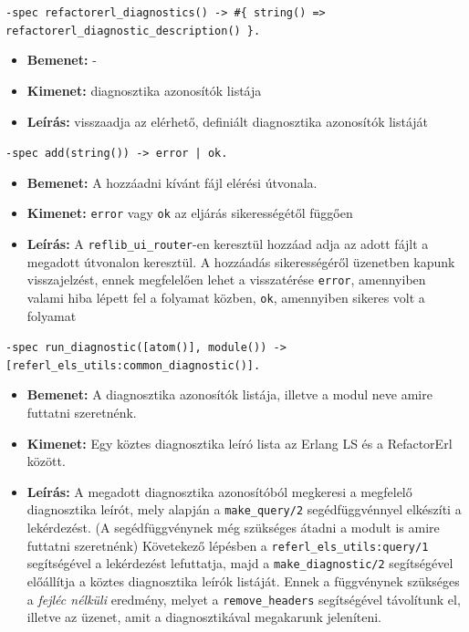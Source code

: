     \noindent \lstinline|-spec refactorerl_diagnostics() -> #{ string() => refactorerl_diagnostic_description() }.|
    \begin{itemize}
        \item \textbf{Bemenet:} -
        \item \textbf{Kimenet:} diagnosztika azonosítók listája
        \item \textbf{Leírás:} visszaadja az elérhető, definiált diagnosztika azonosítók listáját
    \end{itemize}
    
    
    
    \noindent \lstinline{-spec add(string()) -> error | ok.}
    \begin{itemize}
        \item \textbf{Bemenet:} A hozzáadni kívánt fájl elérési útvonala.
        \item \textbf{Kimenet:} \lstinline{error} vagy \lstinline{ok} az eljárás sikerességétől függően
        \item \textbf{Leírás:} A \lstinline{reflib_ui_router}-en keresztül hozzáad adja az adott fájlt a megadott útvonalon keresztül. A hozzáadás sikerességéről üzenetben kapunk visszajelzést, ennek megfelelően lehet a visszatérése \lstinline{error}, amennyiben valami hiba lépett fel a folyamat közben, \lstinline{ok}, amennyiben sikeres volt a folyamat
    \end{itemize}
    
    
    
    \noindent \lstinline{-spec run_diagnostic([atom()], module()) -> [referl_els_utils:common_diagnostic()].}
    \begin{itemize}
        \item \textbf{Bemenet:} A diagnosztika azonosítók listája, illetve a modul neve amire futtatni szeretnénk.
        \item \textbf{Kimenet:} Egy köztes diagnosztika leíró lista az Erlang LS és a RefactorErl között.
        \item \textbf{Leírás:} A megadott diagnosztika azonosítóból megkeresi a megfelelő diagnosztika leírót, mely alapján a \lstinline{make_query/2} segédfüggvénnyel elkészíti a lekérdezést. (A segédfüggvénynek még szükséges átadni a modult is amire futtatni szeretnénk) Követekező lépésben a \lstinline{referl_els_utils:query/1} segítségével a lekérdezést lefuttatja, majd a \lstinline{make_diagnostic/2} segítségével előállítja a köztes diagnosztika leírók listáját. Ennek a függvénynek szükséges a \textit{fejléc nélküli} eredmény, melyet a \lstinline{remove_headers} segítségével távolítunk el, illetve az üzenet, amit a diagnosztikával megakarunk jeleníteni.
    \end{itemize}
    

